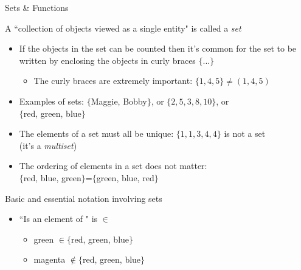 \documentclass[10pt]{seminar}
\begin{document}
\newtheorem{proposition}{Proposition}

\newtheorem{definition}{Definition}

\newtheorem{corollary}{Corollary}

\newtheorem{theorem}{Theorem}

\newtheorem{lemma}{Lemma}

\def\argmax{\mathop{\rm argmax}\limits}  



\sffamily 


\begin{slide}
\begin{center}
Sets \& Functions \small
 

 \end{center}
 
 \newslide
 A ``collection of objects viewed as a single entity" is called a \textit{set}
 
 \vspace{.25in}
 \begin{itemize}
 \item If the objects in the set can be counted then it's common for the set to be written by enclosing the objects in curly braces $\{...\}$
 
 \begin{itemize}
 \item The curly braces are extremely important: $\{1, 4, 5\}\not=(1, 4, 5)$
 \end{itemize}
 
 \item Examples of sets: $\{$Maggie, Bobby$\}$, or $\{2, 5, 3, 8, 10\}$, or \\$\{$red, green, blue$\}$
 
 \item The elements of a set must all be unique: $\{1, 1, 3, 4, 4\}$ is not a set \\(it's a \textit{multiset})
 \item The ordering of elements in a set does not matter: \\$\{$red, blue, green$\}$=$\{$green, blue, red$\}$
 \end{itemize}
 \newslide
 
 Basic and essential notation involving sets
 
  \begin{itemize}
 \item ``Is an element of " is $\in$
 \begin{itemize}
 \item green $\in \{$red, green, blue$\}$
  \item magenta $\not\in \{$red, green, blue$\}$
   \end{itemize}
  

\end{itemize}
\end{slide}
\end{document}
